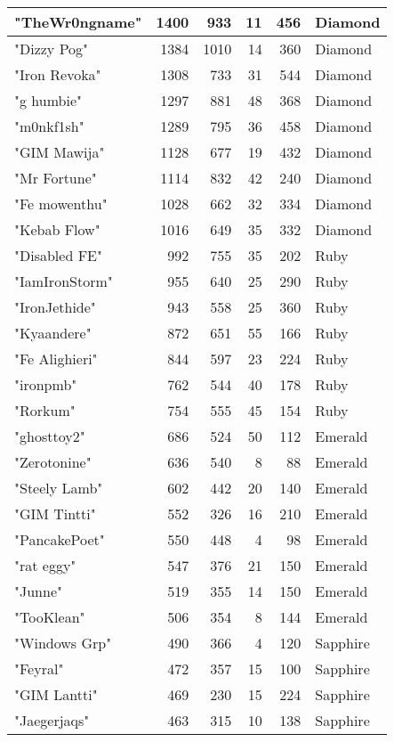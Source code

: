 \documentclass{article}
\begin{document}
\begin{table}[htbp]
\begin{tabular}{|l|r|r|r|r|l|}
"TheWr0ngname" & 1400 & 933 & 11 & 456 & Diamond \\ \hline
"Dizzy Pog" & 1384 & 1010 & 14 & 360 & Diamond \\ \hline
"Iron Revoka" & 1308 & 733 & 31 & 544 & Diamond \\ \hline
"g humbie" & 1297 & 881 & 48 & 368 & Diamond \\ \hline
"m0nkf1sh" & 1289 & 795 & 36 & 458 & Diamond \\ \hline
"GIM Mawija" & 1128 & 677 & 19 & 432 & Diamond \\ \hline
"Mr Fortune" & 1114 & 832 & 42 & 240 & Diamond \\ \hline
"Fe mowenthu" & 1028 & 662 & 32 & 334 & Diamond \\ \hline
"Kebab Flow" & 1016 & 649 & 35 & 332 & Diamond \\ \hline
"Disabled FE" & 992 & 755 & 35 & 202 & Ruby \\ \hline
"IamIronStorm" & 955 & 640 & 25 & 290 & Ruby \\ \hline
"IronJethide" & 943 & 558 & 25 & 360 & Ruby \\ \hline
"Kyaandere" & 872 & 651 & 55 & 166 & Ruby \\ \hline
"Fe Alighieri" & 844 & 597 & 23 & 224 & Ruby \\ \hline
"ironpmb" & 762 & 544 & 40 & 178 & Ruby \\ \hline
"Rorkum" & 754 & 555 & 45 & 154 & Ruby \\ \hline
"ghosttoy2" & 686 & 524 & 50 & 112 & Emerald \\ \hline
"Zerotonine" & 636 & 540 & 8 & 88 & Emerald \\ \hline
"Steely Lamb" & 602 & 442 & 20 & 140 & Emerald \\ \hline
"GIM Tintti" & 552 & 326 & 16 & 210 & Emerald \\ \hline
"PancakePoet" & 550 & 448 & 4 & 98 & Emerald \\ \hline
"rat eggy" & 547 & 376 & 21 & 150 & Emerald \\ \hline
"Junne" & 519 & 355 & 14 & 150 & Emerald \\ \hline
"TooKlean" & 506 & 354 & 8 & 144 & Emerald \\ \hline
"Windows Grp" & 490 & 366 & 4 & 120 & Sapphire \\ \hline
"Feyral" & 472 & 357 & 15 & 100 & Sapphire \\ \hline
"GIM Lantti" & 469 & 230 & 15 & 224 & Sapphire \\ \hline
"Jaegerjaqs" & 463 & 315 & 10 & 138 & Sapphire \\ \hline

\end{tabular}
\end{table}
\end{document}
